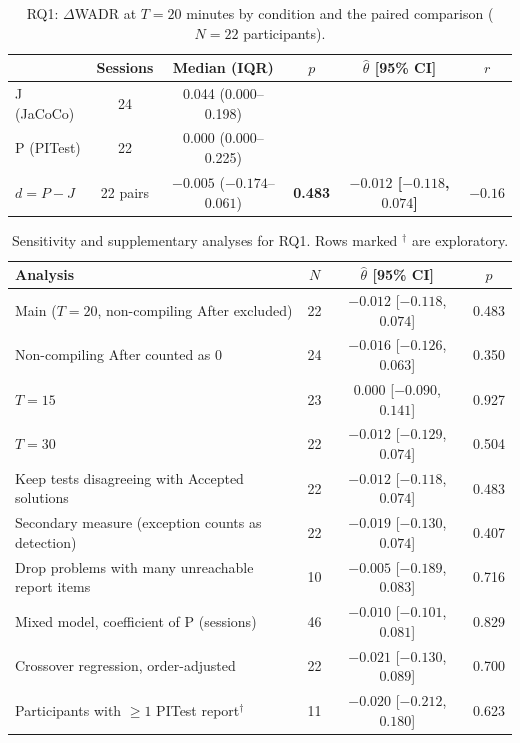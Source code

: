 \begin{table}[t]
\centering
\caption{RQ1: $\Delta$WADR at $T = 20$ minutes by condition and the paired comparison ($N = 22$ participants).}
\label{tab:main}
\begin{tabular}{lccccc}
\hline
 & Sessions & Median (IQR) & $p$ & $\hat{\theta}$ [95\% CI] & $r$ \\
\hline
J (JaCoCo) & 24 & 0.044 (0.000--0.198) & & & \\
P (PITest) & 22 & 0.000 (0.000--0.225) & & & \\
$d = P - J$ & 22 pairs & $-0.005$ ($-0.174$--$0.061$) & \textbf{0.483} & \textbf{$-0.012$ [$-0.118$, $0.074$]} & $-0.16$ \\
\hline
\end{tabular}
\end{table}

\begin{table}[t]
\centering
\caption{Sensitivity and supplementary analyses for RQ1. Rows marked $^{\dagger}$ are exploratory.}
\label{tab:sens}
\begin{tabular}{lccc}
\hline
Analysis & $N$ & $\hat{\theta}$ [95\% CI] & $p$ \\
\hline
Main ($T = 20$, non-compiling After excluded) & 22 & $-0.012$ [$-0.118$, $0.074$] & 0.483 \\
Non-compiling After counted as 0 & 24 & $-0.016$ [$-0.126$, $0.063$] & 0.350 \\
$T = 15$ & 23 & $0.000$ [$-0.090$, $0.141$] & 0.927 \\
$T = 30$ & 22 & $-0.012$ [$-0.129$, $0.074$] & 0.504 \\
Keep tests disagreeing with Accepted solutions & 22 & $-0.012$ [$-0.118$, $0.074$] & 0.483 \\
Secondary measure (exception counts as detection) & 22 & $-0.019$ [$-0.130$, $0.074$] & 0.407 \\
Drop problems with many unreachable report items & 10 & $-0.005$ [$-0.189$, $0.083$] & 0.716 \\
Mixed model, coefficient of P (sessions) & 46 & $-0.010$ [$-0.101$, $0.081$] & 0.829 \\
Crossover regression, order-adjusted & 22 & $-0.021$ [$-0.130$, $0.089$] & 0.700 \\
Participants with $\geq 1$ PITest report$^{\dagger}$ & 11 & $-0.020$ [$-0.212$, $0.180$] & 0.623 \\
\hline
\end{tabular}
\end{table}

